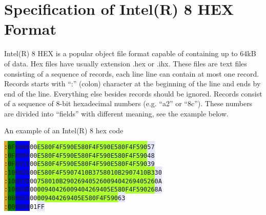 \section{Specification of Intel(R) 8 HEX Format}
    Intel(R) 8 HEX is a popular object file format capable of containing up to 64kB of data. Hex files have usually extension .hex or .ihx. These files are text files consisting of a sequence of records, each line line can contain at most one record. Records starts with ``:'' (colon) character at the beginning of the line and ends by end of the line. Everything else besides records should be ignored. Records consist of a sequence of 8-bit hexadecimal numbers (e.g. ``a2'' or ``8c''). These numbers are divided into ``fields'' with different meaning, see the example below.

    \begin{code}[h]
        \caption{An example of an Intel(R) 8 hex code}
        \mysmallfont{}
        \texttt{\colorbox{Goldenrod}{:}\colorbox{green}{0F}\colorbox{blue}{0000}\colorbox{Apricot}{00}\colorbox{GreenYellow}{E580F4F590E580F4F590E580F4F590}\colorbox{Lavender}{57}}\\
        \texttt{\colorbox{Goldenrod}{:}\colorbox{green}{0F}\colorbox{blue}{000F}\colorbox{Apricot}{00}\colorbox{GreenYellow}{E580F4F590E580F4F590E580F4F590}\colorbox{Lavender}{48}}\\
        \texttt{\colorbox{Goldenrod}{:}\colorbox{green}{0F}\colorbox{blue}{001E}\colorbox{Apricot}{00}\colorbox{GreenYellow}{E580F4F590E580F4F590E580F4F590}\colorbox{Lavender}{39}}\\
        \texttt{\colorbox{Goldenrod}{:}\colorbox{green}{10}\colorbox{blue}{002D}\colorbox{Apricot}{00}\colorbox{GreenYellow}{E580F4F5907410B3758010B2907410B3}\colorbox{Lavender}{30}}\\
        \texttt{\colorbox{Goldenrod}{:}\colorbox{green}{10}\colorbox{blue}{003D}\colorbox{Apricot}{00}\colorbox{GreenYellow}{758010B2902694052600940426940526}\colorbox{Lavender}{0A}}\\
        \texttt{\colorbox{Goldenrod}{:}\colorbox{green}{10}\colorbox{blue}{004D}\colorbox{Apricot}{00}\colorbox{GreenYellow}{00940426009404269405E580F4F59026}\colorbox{Lavender}{8A}}\\
        \texttt{\colorbox{Goldenrod}{:}\colorbox{green}{0B}\colorbox{blue}{005D}\colorbox{Apricot}{00}\colorbox{GreenYellow}{009404269405E580F4F590}\colorbox{Lavender}{63}}\\
        \texttt{\colorbox{Goldenrod}{:}\colorbox{green}{00}\colorbox{blue}{0000}\colorbox{Apricot}{01}\colorbox{Lavender}{FF}}\\\\

\end{code}
